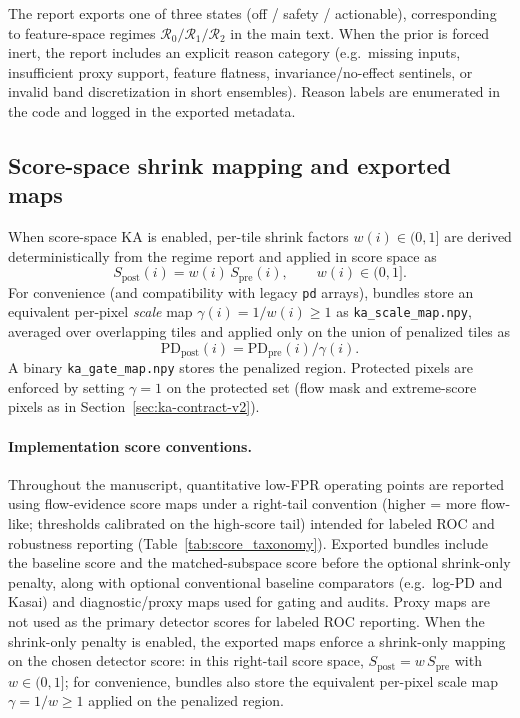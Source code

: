\documentclass[11pt]{article}
\DeclareRobustCommand{\path}[1]{\nolinkurl{#1}}
\newif\ifSTAPSUPPLEMENTONLY
\begin{document}
The report exports one of three states (off / safety / actionable), corresponding to feature-space regimes $\mathcal{R}_0/\mathcal{R}_1/\mathcal{R}_2$ in the main text. When the prior is forced inert, the report includes an explicit reason category (e.g.\ missing inputs, insufficient proxy support, feature flatness, invariance/no-effect sentinels, or invalid band discretization in short ensembles). Reason labels are enumerated in the code and logged in the exported metadata.

\subsection{Score-space shrink mapping and exported maps}
When score-space KA is enabled, per-tile shrink factors $w(i)\in(0,1]$ are derived deterministically from the regime report and applied in score space as
\[
S_{\mathrm{post}}(i)=w(i)\,S_{\mathrm{pre}}(i),\qquad w(i)\in(0,1].
\]
For convenience (and compatibility with legacy \path{pd} arrays), bundles store an equivalent per-pixel \emph{scale} map $\gamma(i)=1/w(i)\ge 1$ as \path{ka_scale_map.npy}, averaged over overlapping tiles and applied only on the union of penalized tiles as
\[
\mathrm{PD}_{\mathrm{post}}(i)=\mathrm{PD}_{\mathrm{pre}}(i)/\gamma(i).
\]
A binary \path{ka_gate_map.npy} stores the penalized region. Protected pixels are enforced by setting $\gamma=1$ on the protected set (flow mask and extreme-score pixels as in \ifSTAPSUPPLEMENTONLY the main paper\else Section~\ref{sec:ka-contract-v2}\fi).

\paragraph{Implementation score conventions.}
Throughout the manuscript, quantitative low-FPR operating points are reported using flow-evidence score maps under a right-tail convention (higher = more flow-like; thresholds calibrated on the high-score tail) intended for labeled ROC and robustness reporting (Table~\ref{tab:score_taxonomy}). Exported bundles include the baseline score and the matched-subspace score before the optional shrink-only penalty, along with optional conventional baseline comparators (e.g.\ log-PD and Kasai) and diagnostic/proxy maps used for gating and audits. Proxy maps are not used as the primary detector scores for labeled ROC reporting. When the shrink-only penalty is enabled, the exported maps enforce a shrink-only mapping on the chosen detector score: in this right-tail score space, $S_{\mathrm{post}}=w\,S_{\mathrm{pre}}$ with $w\in(0,1]$; for convenience, bundles also store the equivalent per-pixel scale map $\gamma=1/w\ge 1$ applied on the penalized region.
\end{document}
